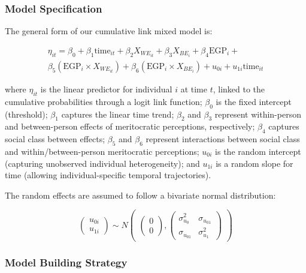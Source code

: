 \documentclass[
  12pt,
]{article}
\begin{document}
\subsubsection{Model Specification}\label{model-specification}

The general form of our cumulative link mixed model is:

\[
\begin{split}
\eta_{it} = \beta_0 + \beta_1 \text{time}_{it} + \beta_2 X_{WE_{it}} + \beta_3 X_{BE_i} + \beta_4 \text{EGP}_i + \\
\beta_5 (\text{EGP}_i \times X_{WE_{it}}) + \beta_6 (\text{EGP}_i \times X_{BE_i}) + u_{0i} + u_{1i} \text{time}_{it}
\end{split}
\]

where \(\eta_{it}\) is the linear predictor for individual \(i\) at time
\(t\), linked to the cumulative probabilities through a logit link
function; \(\beta_0\) is the fixed intercept (threshold); \(\beta_1\)
captures the linear time trend; \(\beta_2\) and \(\beta_3\) represent
within-person and between-person effects of meritocratic perceptions,
respectively; \(\beta_4\) captures social class between effects;
\(\beta_5\) and \(\beta_6\) represent interactions between social class
and within/between-person meritocratic perceptions; \(u_{0i}\) is the
random intercept (capturing unobserved individual heterogeneity); and
\(u_{1i}\) is a random slope for time (allowing individual-specific
temporal trajectories).

The random effects are assumed to follow a bivariate normal
distribution:

\[
\begin{pmatrix} u_{0i} \\ u_{1i} \end{pmatrix} \sim N \begin{pmatrix} \begin{pmatrix} 0 \\ 0 \end{pmatrix}, \begin{pmatrix} \sigma^2_{u_0} & \sigma_{u_{01}} \\ \sigma_{u_{01}} & \sigma^2_{u_1} \end{pmatrix} \end{pmatrix}
\]

\subsubsection{Model Building Strategy}\label{model-building-strategy}
\end{document}
